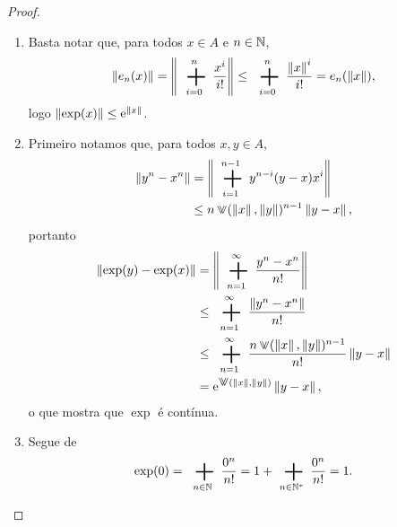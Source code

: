 \begin{proof}
	\begin{enumerate}
	\item Basta notar que, para todos $x \in A$ e $n \in \mathbb{N}$,
		\begin{equation*}
		\nor{e_n(x)} = \nor{\sum_{i=0}^{n} \frac{x^i}{i!}} \leq \sum_{i=0}^{n} \frac{\nor{x}^i}{i!} = e_n(\nor{x}),
		\end{equation*}
logo $\left\Vert{\exp(x)}\right\Vert \leq \mathrm{e}^{\left\Vert{x}\right\Vert}$.
	
	\item Primeiro notamos que, para todos $x,y \in A$,
		\begin{align*}
		\nor{y^n-x^n} &= \nor{\sum_{i=1}^{n-1} y^{n-i}(y-x)x^i} \\
			&\leq n\max(\nor{x},\nor{y})^{n-1}\nor{y-x},
		\end{align*}
portanto
	\begin{align*}
	\nor{\exp(y) - \exp(x)} &= \nor{\sum_{n=1}^\infty \frac{y^n-x^n}{n!}} \\
		&\leq \sum_{n=1}^\infty \frac{\nor{y^n-x^n}}{n!} \\
		&\leq \sum_{n=1}^\infty \frac{n\max(\nor{x},\nor{y})^{n-1}}{n!} \nor{y-x} \\
		&= \ee^{\max(\nor{x},\nor{y})}\nor{y-x},
	\end{align*}
o que mostra que $\exp$ é contínua.
	
	\item Segue de
		\begin{equation*}
		\exp(0) = \sum_{n \in \N} \frac{0^n}{n!} = 1 + \sum_{n \in \N^*} \frac{0^n}{n!} = 1.
		\end{equation*}


\end{enumerate}
\end{proof}
